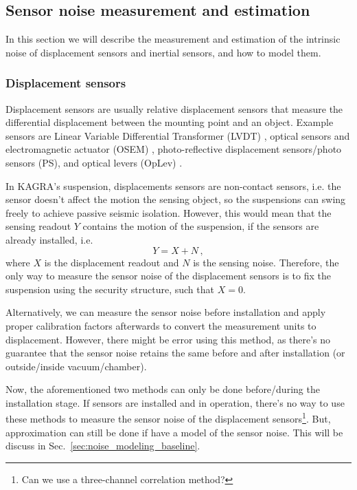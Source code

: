 \subsection{Sensor noise measurement and estimation \label{sec:sensor_noise_measurement}}
In this section we will describe the measurement and estimation of the intrinsic noise of displacement sensors and inertial sensors, and how to model them.

\subsubsection{Displacement sensors \label{sec:displacement_sensors_baseline}}
Displacement sensors are usually relative displacement sensors that measure the differential displacement between the mounting point and an object.
Example sensors are Linear Variable Differential Transformer (LVDT) \cite{Akutsu:2021auw}, optical sensors and electromagnetic actuator (OSEM) \cite{Akutsu:2020efg, use_of_osems}, photo-reflective displacement sensors/photo sensors (PS), and optical levers (OpLev) \cite{sensing_matrices_oplev, length_sensing_oplev, optical_lever_for_kagra}.

In KAGRA's suspension, displacements sensors are non-contact sensors, i.e. the sensor doesn't affect the motion the sensing object, so the suspensions can swing freely to achieve passive seismic isolation.
However, this would mean that the sensing readout $Y$ contains the motion of the suspension, if the sensors are already installed, i.e.
\begin{equation}
	Y=X+N\,,
	\label{eqn:displacement_sensing_readout}
\end{equation}
where $X$ is the displacement readout and $N$ is the sensing noise.
Therefore, the only way to measure the sensor noise of the displacement sensors is to fix the suspension using the security structure, such that $X=0$.

Alternatively, we can measure the sensor noise before installation and apply proper calibration factors afterwards to convert the measurement units to displacement.
However, there might be error using this method, as there's no guarantee that the sensor noise retains the same before and after installation (or outside/inside vacuum/chamber).

Now, the aforementioned two methods can only be done before/during the installation stage.
If sensors are installed and in operation, there's no way to use these methods to measure the sensor noise of the displacement sensors\footnote{Can we use a three-channel correlation method?}.
But, approximation can still be done if have a model of the sensor noise.
This will be discuss in Sec.~\ref{sec:noise_modeling_baseline}.

